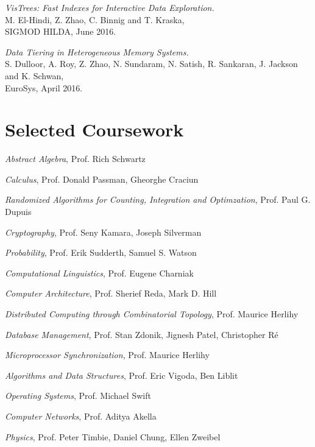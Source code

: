 \documentclass[letterpaper]{article}
\renewenvironment{itemize}{
  \begin{list}{}{
    \setlength{\leftmargin}{1.5em}
  }
}{
  \end{list}
}
\begin{document}
\begin{itemize}
\item \textit{VisTrees: Fast Indexes for Interactive Data Exploration.} \\
  M. El-Hindi, Z. Zhao, C. Binnig and T. Kraska, \\
  SIGMOD HILDA, June 2016.

\item \textit{Data Tiering in Heterogeneous Memory Systems.} \\
  S. Dulloor, A. Roy, Z. Zhao, N. Sundaram, N. Satish, R. Sankaran, J. Jackson and K. Schwan, \\
  EuroSys, April 2016.

\end{itemize}

\section*{Selected Coursework}
\begin{itemize}
\item \textit{Abstract Algebra}, Prof. Rich Schwartz
\item \textit{Calculus}, Prof. Donald Passman, Gheorghe Craciun
\item \textit{Randomized Algorithms for Counting, Integration and Optimzation}, Prof. Paul G. Dupuis
\item \textit{Cryptography}, Prof. Seny Kamara, Joseph Silverman
\item \textit{Probability}, Prof. Erik Sudderth, Samuel S. Watson 
\item \textit{Computational Linguistics}, Prof. Eugene Charniak
\item \textit{Computer Architecture}, Prof. Sherief Reda, Mark D. Hill
\item \textit{Distributed Computing through Combinatorial Topology}, Prof. Maurice Herlihy
\item \textit{Database Management}, Prof. Stan Zdonik, Jignesh Patel, Christopher R\'e
\item \textit{Microprocessor Synchronization}, Prof. Maurice Herlihy
\item \textit{Algorithms and Data Structures}, Prof. Eric Vigoda, Ben Liblit
\item \textit{Operating Systems}, Prof. Michael Swift
\item \textit{Computer Networks}, Prof. Aditya Akella
\item \textit{Physics}, Prof. Peter Timbie, Daniel Chung, Ellen Zweibel
\end{itemize}

\bigskip
\end{document}
